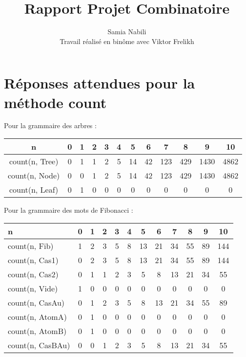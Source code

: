 \documentclass[a4paper, titlepage]{article}
\title{Rapport Projet Combinatoire}
\author{Samia Nabili\\Travail réalisé en binôme avec Viktor Frelikh}
\begin{document}
{\let\newpage\relax\maketitle}

\maketitle

\section{Réponses attendues pour la méthode count}
Pour la grammaire des arbres :
\begin{center}
\begin{tabular}{|c||c|c|c|c|c|c|c|c|c|c|c|}
\hline n & 0 & 1 & 2 & 3 & 4 & 5 & 6 & 7 & 8 & 9 & 10 \\
\hline
\hline count(n, Tree) & 0 & 1 & 1 & 2 & 5 & 14 & 42 & 123 & 429 & 1430
& 4862 \\
\hline count(n, Node) & 0 & 0 & 1 & 2 & 5 & 14 & 42 & 123 & 429 & 1430 & 4862 \\
\hline count(n, Leaf) & 0 & 1 & 0 & 0 & 0 & 0 & 0 & 0 & 0 & 0 & 0\\
\hline
\end{tabular}
\end{center}

Pour la grammaire des mots de Fibonacci :
\begin{center}
\begin{tabular}{|l||c|c|c|c|c|c|c|c|c|c|c|}
\hline n & 0 & 1 & 2 & 3 & 4 & 5 & 6 & 7 & 8 & 9 & 10 \\
\hline
\hline count(n, Fib) & 1 & 2 & 3 & 5 & 8 & 13 & 21 & 34 & 55 & 89 & 144 \\
\hline count(n, Cas1) & 0 & 2 & 3 & 5 & 8 & 13 & 21 & 34 & 55 & 89 & 144 \\
\hline count(n, Cas2) & 0 & 1 & 1 & 2 & 3 & 5 & 8 & 13 & 21 & 34 & 55\\
\hline count(n, Vide) & 1 & 0 & 0 & 0 & 0 & 0 & 0 & 0 & 0 & 0 & 0\\
\hline count(n, CasAu) & 0 & 1 & 2 & 3 & 5 & 8 & 13 & 21 & 34 & 55 & 89\\
\hline count(n, AtomA) & 0 & 1 & 0 & 0 & 0 & 0 & 0 & 0 & 0 & 0 & 0\\
\hline count(n, AtomB) & 0 & 1 & 0 & 0 & 0 & 0 & 0 & 0 & 0 & 0 & 0\\
\hline count(n, CasBAu) & 0 & 0 & 1 & 2 & 3 & 5 & 8 & 13 & 21 & 34 & 55\\
\hline
\end{tabular}
\end{center}
\end{document}
